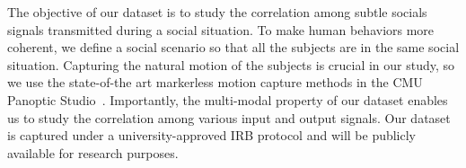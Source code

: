 The objective of our dataset is to study the correlation among subtle socials signals transmitted during a social situation. To make human behaviors more coherent, we define a social scenario so that all the subjects are in the same social situation. Capturing the natural motion of the subjects is crucial in our study, so we use the state-of-the art markerless motion capture methods in the CMU Panoptic Studio~\cite{joo2017panoptic, joo2018}. Importantly, the multi-modal property of our dataset enables us to study the correlation among various input and output signals. Our dataset is captured under a university-approved IRB protocol and will be publicly available for research purposes.

